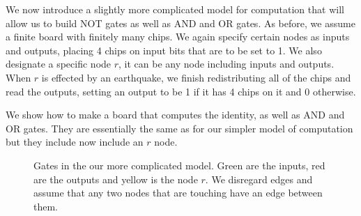 \documentclass[runningheads,a4paper]{llncs}
\begin{document}
We now introduce a slightly more complicated model for computation that will allow us to build NOT gates as well as AND and OR gates. As before, we assume a finite board with finitely many chips. We again specify certain nodes as  inputs and outputs, placing 4 chips on input bits that are to be set to 1. We also designate a specific node $r$, it can be any node including inputs and outputs. When $r$ is effected by an earthquake, we finish redistributing all of the chips and read the outputs, setting an output to be 1 if it has 4 chips on it and 0 otherwise. 

We show how to make a board that computes the identity, as well as AND and OR gates. They are essentially the same as for our simpler model of computation but they include now include an $r$ node.

\begin{figure}
\centering
{}
\qquad\qquad
{}
\qquad\qquad
{}
\caption{Gates in the our more complicated model. Green are the inputs, red are the outputs and yellow is the node $r$. We disregard edges and assume that any two nodes that are touching have an edge between them.}
\label{fig:simplegateswithr}
\end{figure}


\end{document}
